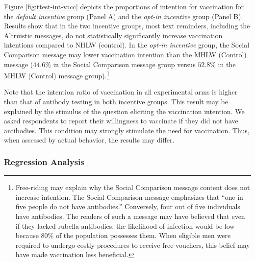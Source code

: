 \documentclass[
]{article}
\begin{document}
Figure \ref{fig:ttest-int-vacc} depicts the proportions of intention for vaccination for the \emph{default incentive} group (Panel A) and the \emph{opt-in incentive} group (Panel B). Results show that in the two incentive groups, most text reminders, including the Altruistic messages, do not statistically significantly increase vaccination intentions compared to NHLW (control). In the \emph{opt-in incentive} group, the Social Comparison message may lower vaccination intention than the MHLW (Control) message (\(44.6\)\% in the Social Comparison message group versus \(52.8\)\% in the MHLW (Control) message group).\footnote{Free-riding may explain why the Social Comparison message content does not increase intention. The Social Comparison message emphasizes that ``one in five people do not have antibodies.'' Conversely, four out of five individuals have antibodies. The readers of such a message may have believed that even if they lacked rubella antibodies, the likelihood of infection would be low because 80\% of the population possesses them. When eligible men were required to undergo costly procedures to receive free vouchers, this belief may have made vaccination less beneficial.}

Note that the intention ratio of vaccination in all experimental arms is higher than that of antibody testing in both incentive groups. This result may be explained by the stimulus of the question eliciting the vaccination intention. We asked respondents to report their willingness to vaccinate if they did not have antibodies. This condition may strongly stimulate the need for vaccination. Thus, when assessed by actual behavior, the results may differ.

\hypertarget{regression-analysis}{%
\subsubsection{Regression Analysis}\label{regression-analysis}}
\end{document}
